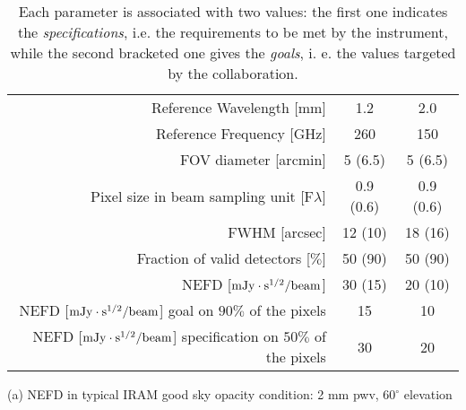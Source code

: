 


\begin{table}[ht]
\begin{center}
\begin{threeparttable}
\begin{tabular}{|r|c|c|}
  \hline
  \hline
Reference Wavelength  [mm]  &  1.2 & 2.0  \\
Reference Frequency  [GHz]  &  260 & 150  \\
\hline  
\hline
FOV diameter [arcmin]       &  5 (6.5)    &  5 (6.5)   \\
Pixel size in beam sampling unit [F$\lambda$]  &  0.9 (0.6)   &   0.9 (0.6)  \\
FWHM  [arcsec]              &  12 (10)   &  18 (16) \\
Fraction of valid detectors [$\%$] &  50 (90)   &  50 (90) \\
NEFD\tnote{a}\hspace{1mm}   [$\rm{mJy} \cdot \rm{s}^{1/2}/\rm{beam}$]  &  30 (15)   &  20 (10) \\
\hline
NEFD [$\rm{mJy} \cdot \rm{s}^{1/2}/\rm{beam}$] goal on $90\%$ of the pixels  &  15  & 10 \\
NEFD [$\rm{mJy} \cdot \rm{s}^{1/2}/\rm{beam}$] specification on $50\%$ of the pixels  &  30  &  20  \\
\hline
\end{tabular}
\begin{tablenotes}
{\small
  \item[(a)] NEFD in typical IRAM good sky opacity condition: 2 mm pwv, $60^\circ$ elevation
}
\end{tablenotes}
\end{threeparttable}
\caption[Main characteristics defining the expected performances of NIKA2.]{Each parameter is associated with two values: the first one indicates the \emph{specifications}, i.e. the requirements to be met by the instrument, while the second bracketed one gives the \emph{goals}, i. e. the values targeted by the collaboration.}
\label{nika2specs}
\end{center}
\end{table} 

